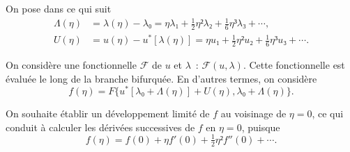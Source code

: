 \documentclass[12pt, final]{scrartcl}
\theoremstyle{definition}
\begin{document}
On pose dans ce qui suit
\begin{align}
  \label{eq:20211112155446}
  Λ(η) & = λ(η) - λ₀ = η λ₁ + \tfrac{1}{2} η² λ₂ + \tfrac{1}{6} η³ λ₃ + \cdots,\\
  \label{eq:20211112113028}
  U(η) & = u(η) - u^{\ast}[λ(η)] = η u₁ + \tfrac{1}{2} η² u₂ + \tfrac{1}{6} η³ u₃ + \cdots.
\end{align}

On considère une fonctionnelle \(\mathcal{F}\) de \(u\) et \(λ\)~:
\(\mathcal{F}(u, λ)\). Cette fonctionnelle est évaluée le long de la branche
bifurquée. En d'autres termes, on considère
\begin{equation*}
  f(η) = F\{ u^{\ast} [λ₀ + Λ(η)] + U(η), λ₀ + Λ(η) \}.
\end{equation*}

On souhaite établir un développement limité de \(f\) au voisinage de \(η = 0\),
ce qui conduit à calculer les dérivées successives de \(f\) en \(η = 0\),
puisque
\begin{equation*}
  f(η) = f(0) + η f'(0) + \tfrac{1}{2} η² f''(0) + \cdots.
\end{equation*}
\end{document}

